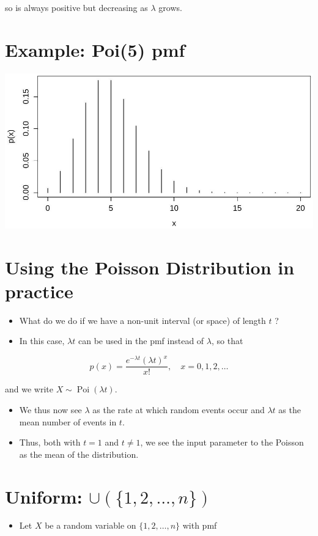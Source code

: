 \documentclass[10pt]{article}
\begin{document}
so is always positive but decreasing as $\lambda$ grows.

\section*{Example: Poi(5) pmf}
\begin{center}
\includegraphics[max width=\textwidth]{2025_05_11_35704811148ad612caa6g-37}
\end{center}

\section*{Using the Poisson Distribution in practice}
\begin{itemize}
  \item What do we do if we have a non-unit interval (or space) of length $t$ ?
  \item In this case, $\lambda t$ can be used in the pmf instead of $\lambda$, so that
\end{itemize}

$$
p(x)=\frac{e^{-\lambda t}(\lambda t)^{x}}{x!}, \quad x=0,1,2, \ldots
$$

and we write $X \sim \operatorname{Poi}(\lambda t)$.

\begin{itemize}
  \item We thus now see $\lambda$ as the rate at which random events occur and $\lambda t$ as the mean number of events in $t$.
  \item Thus, both with $t=1$ and $t \neq 1$, we see the input parameter to the Poisson as the mean of the distribution.
\end{itemize}

\section*{Uniform: $\cup(\{1,2, \ldots, n\})$}
\begin{itemize}
  \item Let $X$ be a random variable on $\{1,2, \ldots, n\}$ with pmf
\end{itemize}
\end{document}
